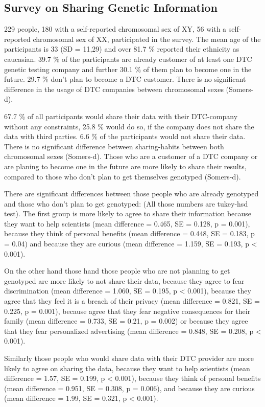 \documentclass[10pt]{article}
\begin{document}
\subsection*{Survey on Sharing Genetic Information}
229 people, 180 with a self-reported chromosomal sex of XY, 56 with a self-reported chromosomal sex of XX, participated in the survey. The mean age of the participants is 33 (SD = 11,29) and over 81.7 \% reported their ethnicity as caucasian. 39.7 \% of the participants are already customer of at least one DTC genetic testing company and further 30.1 \% of them plan to become one in the future. 29.7 \% don't plan to become a DTC customer. There is no significant difference in the usage of DTC companies between chromosomal sexes (Somers-d). 

67.7 \% of all participants would share their data with their DTC-company without any constraints, 25.8 \% would do so, if the company does not share the data with third parties. 6.6 \% of the participants would not share their data. There is no significant difference between sharing-habits between both chromosomal sexes (Somers-d). Those who are a customer of a DTC company or are planing to become one in the future are more likely to share their results, compared to those who don't plan to get themselves genotyped (Somers-d). 

There are significant differences between those people who are already genotyped and those who don't plan to get genotyped: (All those numbers are tukey-hsd test). The first group is more likely to agree to share their information because they want to help scientists (mean difference = 0.465, SE = 0.128, p = 0.001), because they think of personal benefits (mean difference = 0.448, SE = 0.183, p = 0.04) and because they are curious (mean difference = 1.159, SE = 0.193, p < 0.001). 

On the other hand those hand those people who are not planning to get genotyped are more likely to not share their data, because they agree to fear discrimination (mean difference = 1.060, SE = 0.195, p < 0.001), because they agree that they feel it is a breach of their privacy (mean difference = 0.821, SE = 0.225, p = 0.001), because agree that they fear negative consequences for their family (mean difference = 0.733, SE = 0.21, p = 0.002) or because they agree that they fear personalized advertising (mean difference = 0.848, SE = 0.208, p < 0.001).

Similarly those people who would share data with their DTC provider are more likely to agree on sharing the data, because they want to help scientists (mean difference = 1.57, SE = 0.199, p < 0.001), because they think of personal benefits (mean difference = 0.951, SE = 0.308, p = 0.006), and because they are curious (mean difference = 1.99, SE = 0.321, p < 0.001). 
\end{document}
